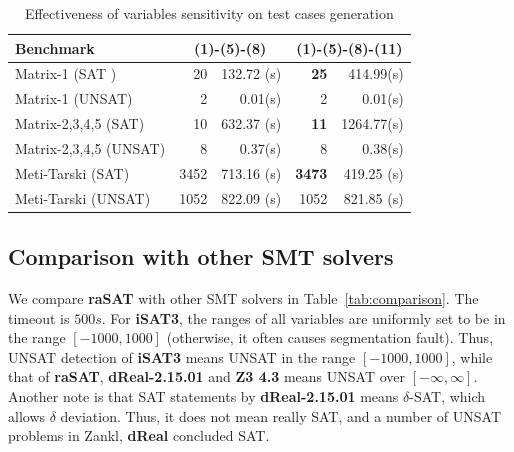 \documentclass[runningheads,a4paper,oribibl]{llncs}
\begin{document}
\begin{table}
\begin{center}
\begin{tabular}{ | l | r | r | r | r |}
\hline
    \multicolumn{1}{|l|}{Benchmark} & \multicolumn{2}{c|}{(1)-(5)-(8)} &
    \multicolumn{2}{c|}{(1)-(5)-(8)-(11)} \\
\hline
    Matrix-1 (SAT ) & 20 & 132.72 (s) & \textbf{25} & 414.99(s)
\\
\hline
    Matrix-1 (UNSAT) & 2 & 0.01(s) & 2 & 0.01(s)
\\
\hline
	Matrix-2,3,4,5 (SAT) & 10 & 632.37 (s) & \textbf{11} & 1264.77(s)
\\
\hline
    Matrix-2,3,4,5 (UNSAT) & 8 & 0.37(s) & 8 & 0.38(s)
\\ \hline
    Meti-Tarski (SAT) & 3452 & 713.16 (s) & \textbf{3473} & 419.25 (s)
\\
\hline
    Meti-Tarski (UNSAT) & 1052 & 822.09 (s) & 1052 & 821.85 (s)
\\
\hline
\end{tabular}
\end{center}
\caption{Effectiveness of variables sensitivity on test cases generation} 
\label{tab:test-sen}
\end{table}

\subsection{Comparison with other SMT solvers}

We compare {\bf raSAT} with other SMT solvers in Table~\ref{tab:comparison}.
The timeout is $500s$. 
For {\bf iSAT3}, the ranges of all variables are uniformly set to be in the range $[-1000, 1000]$
(otherwise, it often causes segmentation fault). 
Thus, UNSAT detection of {\bf iSAT3} means UNSAT in the range $[-1000, 1000]$, 
while that of {\bf raSAT}, \textbf{dReal-2.15.01} and {\bf Z3 4.3} means UNSAT over $[-\infty, \infty]$.
Another note is that SAT statements by \textbf{dReal-2.15.01} means $\delta$-SAT, which allows
$\delta$ deviation. Thus, it does not mean really SAT, and a number of UNSAT problems in
Zankl, \textbf{dReal} concluded SAT.
\end{document}
